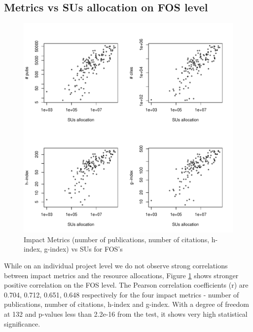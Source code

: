 \documentclass{sig-alternate}
\begin{document}
\subsection{Metrics vs SUs allocation on FOS level} 
 
\begin{figure}[!htb] 
  \centering 
    \includegraphics[width=1.0\columnwidth]{images/03_metrics_vs_alloc_fos.pdf} 
  \caption{Impact Metrics (number of publications, number of citations, h-index, g-index) vs SUs for FOS's}\label{F:metrics-vs-alloc-fos} 
\end{figure} 

While on an individual project level we do not observe strong correlations between impact metrics and the resource allocations, Figure \ref {F:metrics-vs-alloc-fos} shows stronger positive correlation on the FOS level. The Pearson correlation coefficients (r) are 0.704, 0.712, 0.651, 0.648 respectively for the four impact metrics - number of publications, number of citations, h-index and g-index. With a degree of freedom at 132 and p-values less than 2.2e-16 from the test, it shows very high statistical significance.  
 
\end{document}
